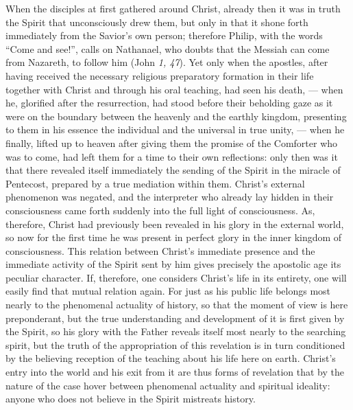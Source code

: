 \documentclass[12pt]{book}
\newcommand{\opage}[1]{\marginnote{\footnotesize\textit{[#1]}}}
\begin{document}
When the disciples at first gathered around Christ, already then it was in truth
the Spirit that unconsciously drew them, but only in that it shone forth
immediately from the Savior's own person; therefore Philip, with the words ``Come
and see!'', calls on Nathanael, who doubts that the Messiah can come from
Nazareth, to follow him (John \textit{1, 47}). Yet only when the apostles, after
having received the necessary religious preparatory formation in their life
together with Christ and through his oral teaching, had seen his death, --- when
he, glorified after the resurrection, had stood before their beholding gaze as
it were on the boundary between the heavenly and the earthly kingdom, presenting
to them in his essence the individual and the universal in true unity, --- when
he finally, lifted up to heaven after giving them the promise of the Comforter
who was to come, had left them for a time to their own reflections: only then was
it that there revealed itself immediately the sending of the Spirit in the
miracle of Pentecost, prepared by a true mediation within them. Christ's external
phenomenon was negated, and the interpreter who already lay hidden in their
consciousness came forth suddenly into the full light of consciousness. As,
therefore, Christ had previously been revealed in his glory in the external
world, so now for the first time he was present in perfect glory in the inner
kingdom of consciousness. This relation between Christ's immediate presence and
the immediate activity of the Spirit sent by him gives precisely the apostolic
age its peculiar character. If, therefore, one considers Christ's life in its
entirety, one will easily find that mutual relation again. For just as his
public life belongs most nearly to the phenomenal actuality of history, so that
the moment of view is here
\opage{155} preponderant, but the true understanding and development of it is
first given by the Spirit, so his glory with the Father reveals itself most
nearly to the searching spirit, but the truth of the appropriation of this
revelation is in turn conditioned by the believing reception of the teaching
about his life here on earth. Christ's entry into the world and his exit from it
are thus forms of revelation that by the nature of the case hover between
phenomenal actuality and spiritual ideality: anyone who does not believe in the
Spirit mistreats history.
\end{document}

